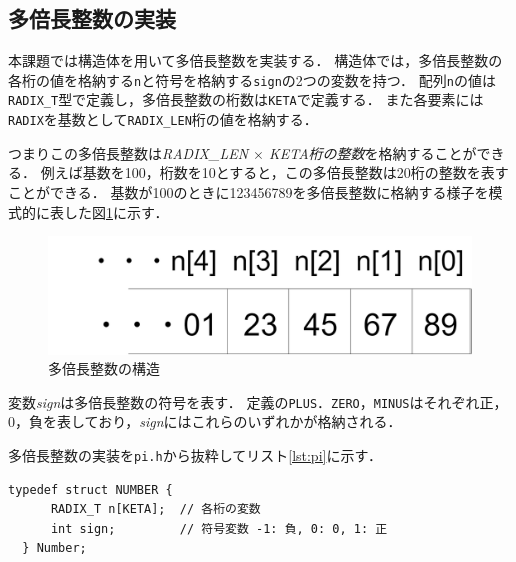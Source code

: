 \documentclass[a4paper,11pt,dvipdfmx]{jsarticle}
\begin{document}
\subsection{多倍長整数の実装}
本課題では構造体を用いて多倍長整数を実装する．
構造体では，多倍長整数の各桁の値を格納する\texttt{n}と符号を格納する\texttt{sign}の2つの変数を持つ．
配列\texttt{n}の値は\texttt{RADIX\_T}型で定義し，多倍長整数の桁数は\texttt{KETA}で定義する．
また各要素には\texttt{RADIX}を基数として\texttt{RADIX\_LEN}桁の値を格納する．

つまりこの多倍長整数は\emph{\textit{RADIX\_LEN} $\times$ \textit{KETA}桁の整数}を格納することができる．
例えば基数を100，桁数を10とすると，この多倍長整数は20桁の整数を表すことができる．
基数が100のときに123456789を多倍長整数に格納する様子を模式的に表した図\ref{fig:struct}に示す．
\begin{figure}[H]
  \centering
  \includegraphics[width=0.5\linewidth]{./images/struct.drawio.png}
  \caption{多倍長整数の構造}
  \label{fig:struct}
\end{figure}

変数\textit{sign}は多倍長整数の符号を表す．
定義の\texttt{PLUS}．\texttt{ZERO}，\texttt{MINUS}はそれぞれ正，0，負を表しており，\textit{sign}にはこれらのいずれかが格納される．

多倍長整数の実装を\texttt{pi.h}から抜粋してリスト\ref{lst:pi}に示す．
\begin{lstlisting}[caption=多倍長整数の実装,label=lst:pi]
  typedef struct NUMBER {
      RADIX_T n[KETA];  // 各桁の変数
      int sign;         // 符号変数 -1: 負, 0: 0, 1: 正
  } Number;
\end{lstlisting}
\end{document}
